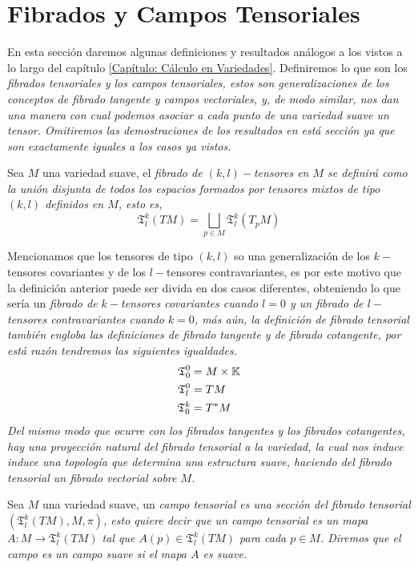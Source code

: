 \section{Fibrados y Campos Tensoriales}\label{Sección: Campos Tensoriales}
En esta sección daremos algunas definiciones y resultados análogos a los
vistos a lo largo del capítulo \ref{Capítulo: Cálculo en Variedades}.
Definiremos lo que son los \it{fibrados tensoriales} y los \it{campos
	tensoriales}, estos son generalizaciones de los conceptos de fibrado tangente y
campos vectoriales, y, de modo similar, nos dan una manera con cual podemos
asociar a cada punto de una variedad suave un tensor. Omitiremos las
demostraciones de los resultados en está sección ya que son exactamente iguales
a los casos ya vistos.

\begin{definition}
	Sea $M$ una variedad suave, el \it{fibrado de $(k,l)-$tensores en
		$M$} se definirá como la unión disjunta de todos los espacios formados por
	tensores mixtos	de tipo $(k,l)$ definidos en $M$, esto es,
	\[
		\mathfrak{T}^{k}_{l}(TM) = \bigsqcup_{p \in M} \mathfrak{T}^{k}_{l}(T_{p}M)
	\]
\end{definition}

Mencionamos que los tensores de tipo $(k,l)$ so una generalización de los
$k-$tensores covariantes y de los $l-$tensores contravariantes, es por este
motivo que la definición anterior puede ser divida en dos casos diferentes,
obteniendo lo que sería un \it{fibrado de $k-$tensores covariantes} cuando $l=0$
y un \it{fibrado de $l-$tensores contravariantes} cuando $k=0$, más aún, la
definición de fibrado tensorial también engloba las definiciones de fibrado
tangente y de fibrado cotangente, por está razón tendremos las siguientes
igualdades.
\begin{align*}
	\mathfrak{T}^{0}_{0} & = M \times \mathbb{K} \\
	\mathfrak{T}^{0}_{l} & = TM          \\
	\mathfrak{T}^{k}_{0} & = T^{*}M
\end{align*}
Del mismo modo que ocurre con los fibrados tangentes y los fibrados cotangentes,
hay una proyección natural del fibrado tensorial a la variedad, la cual nos
induce induce una topología que determina una estructura suave, haciendo del
fibrado tensorial un fibrado vectorial sobre $M$.

\begin{definition}
	Sea $M$ una variedad suave, un \it{campo tensorial} es una sección del fibrado
	tensorial $(\mathfrak{T}^{k}_{l}(TM), M, \pi)$, esto quiere decir que un campo
	tensorial es un mapa $A: M \to \mathfrak{T}^{k}_{l}(TM)$ tal que $A(p) \in
		\mathfrak{T}^{k}_{l}(TM)$ para cada $p \in M$. Diremos que el campo es un
	\it{campo suave} si el mapa $A$ es suave.
\end{definition}

